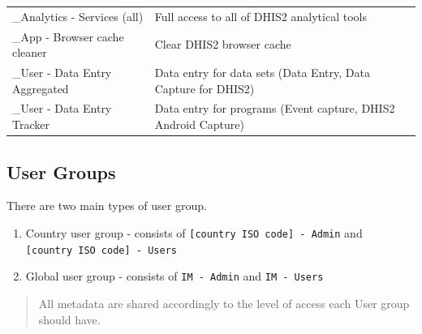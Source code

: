 \documentclass[]{book}
\providecommand{\tightlist}{%
  \setlength{\itemsep}{0pt}\setlength{\parskip}{0pt}}
\begin{document}
\begin{longtable}[]{@{}ll@{}}
\begin{minipage}[t]{0.27\columnwidth}\raggedright
\_Analytics - Services (all)\strut
\end{minipage} & \begin{minipage}[t]{0.67\columnwidth}\raggedright
Full access to all of DHIS2 analytical tools\strut
\end{minipage}\tabularnewline
\begin{minipage}[t]{0.27\columnwidth}\raggedright
\_App - Browser cache cleaner\strut
\end{minipage} & \begin{minipage}[t]{0.67\columnwidth}\raggedright
Clear DHIS2 browser cache\strut
\end{minipage}\tabularnewline
\begin{minipage}[t]{0.27\columnwidth}\raggedright
\_User - Data Entry Aggregated\strut
\end{minipage} & \begin{minipage}[t]{0.67\columnwidth}\raggedright
Data entry for data sets (Data Entry, Data Capture for DHIS2)\strut
\end{minipage}\tabularnewline
\begin{minipage}[t]{0.27\columnwidth}\raggedright
\_User - Data Entry Tracker\strut
\end{minipage} & \begin{minipage}[t]{0.67\columnwidth}\raggedright
Data entry for programs (Event capture, DHIS2 Android Capture)\strut
\end{minipage}\tabularnewline
\bottomrule
\end{longtable}

\hypertarget{user-groups}{%
\subsection{User Groups}\label{user-groups}}

There are two main types of user group.

\begin{enumerate}
\def\labelenumi{\arabic{enumi}.}
\tightlist
\item
  Country user group - consists of \texttt{{[}country\ ISO\ code{]}\ -\ Admin} and \texttt{{[}country\ ISO\ code{]}\ -\ Users}
\item
  Global user group - consists of \texttt{IM\ -\ Admin} and \texttt{IM\ -\ Users}
\end{enumerate}

\begin{quote}
All metadata are shared accordingly to the level of access each User group should have.
\end{quote}
\end{document}
